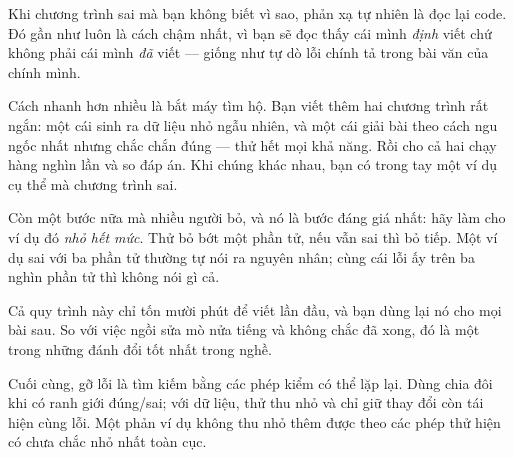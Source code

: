 \documentclass[../../algorithm.tex]{subfiles}
\begin{document}
\begin{dongian}
Khi chương trình sai mà bạn không biết vì sao, phản xạ tự nhiên là đọc lại code. Đó gần như luôn là cách chậm nhất, vì bạn sẽ đọc thấy cái mình \emph{định} viết chứ không phải cái mình \emph{đã} viết --- giống như tự dò lỗi chính tả trong bài văn của chính mình.

Cách nhanh hơn nhiều là bắt máy tìm hộ. Bạn viết thêm hai chương trình rất ngắn: một cái sinh ra dữ liệu nhỏ ngẫu nhiên, và một cái giải bài theo cách ngu ngốc nhất nhưng chắc chắn đúng --- thử hết mọi khả năng. Rồi cho cả hai chạy hàng nghìn lần và so đáp án. Khi chúng khác nhau, bạn có trong tay một ví dụ cụ thể mà chương trình sai.

Còn một bước nữa mà nhiều người bỏ, và nó là bước đáng giá nhất: hãy làm cho ví dụ đó \emph{nhỏ hết mức}. Thử bỏ bớt một phần tử, nếu vẫn sai thì bỏ tiếp. Một ví dụ sai với ba phần tử thường tự nói ra nguyên nhân; cùng cái lỗi ấy trên ba nghìn phần tử thì không nói gì cả.

Cả quy trình này chỉ tốn mười phút để viết lần đầu, và bạn dùng lại nó cho mọi bài sau. So với việc ngồi sửa mò nửa tiếng và không chắc đã xong, đó là một trong những đánh đổi tốt nhất trong nghề.

Cuối cùng, gỡ lỗi là tìm kiếm bằng các phép kiểm có thể lặp lại. Dùng chia đôi khi có ranh giới đúng/sai; với dữ liệu, thử thu nhỏ và chỉ giữ thay đổi còn tái hiện cùng lỗi. Một phản ví dụ không thu nhỏ thêm được theo các phép thử hiện có chưa chắc nhỏ nhất toàn cục.
\end{dongian}
\end{document}
